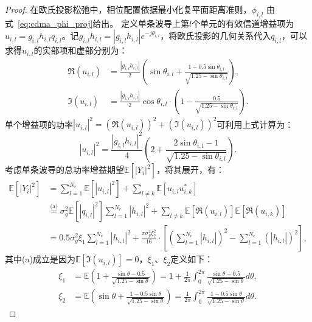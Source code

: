 \begin{proof}
	在欧氏投影松弛中，相位配置依据最小化复平面距离准则，$\phi_{i,l}$ 由式~\eqref{eq:cdma_phi_proj}给出。
	定义单条波导上第$l$个单元的有效信道增益项为$u_{i,l} = g_{i,l} h_{i,l} q_{i,l}$。记$g_{i,l} h_{i,l} = |g_{i,l} h_{i,l}| e^{-j\theta_{i,l}}$，将欧氏投影的几何关系代入$q_{i,l}$，可以求得$u_{i,l}$的实部项和虚部分别为：
	\begin{align}
		\Re(u_{i,l}) &= \frac{|g_{i,l} h_{i,l}|}{2} \left( \sin\theta_{i,l} + \frac{1 - 0.5\sin\theta_{i,l}}{\sqrt{1.25 - \sin\theta_{i,l}}} \right), \\
		\Im(u_{i,l}) &= \frac{|g_{i,l} h_{i,l}|}{2} \cos\theta_{i,l}\cdot \left( 1 - \frac{0.5}{\sqrt{1.25 - \sin\theta_{i,l}}} \right).
	\end{align}
	单个增益项的功率$|u_{i,l}|^2=(\Re(u_{i,l}))^2+(\Im(u_{i,l}))^2$可利用上式计算为：
	\begin{equation}
		|u_{i,l}|^2 
		= \frac{|g_{i,l}h_{i,l}|^2}{4} \left(2 + \frac{2\sin\theta_{i,l} - 1}{\sqrt{1.25 - \sin\theta_{i,l}}}\right).
	\end{equation}
	考虑单条波导的总功率增益期望$\mathbb{E}[|Y_i|^2]$，将其展开，有：
	\begin{align}
		\mathbb{E}[|Y_i|^2] 
		&= \sum_{l=1}^{N_e} \mathbb{E}[|u_{i,l}|^2] + \sum_{l \neq k} \mathbb{E}[u_{i,l} u_{i,k}^*] \\
		&\overset{\text{(a)}}{=} \sigma_g^2 \mathbb{E}[|q_{i,l}|^2] \sum_{l=1}^{N_e} |h_{i,l}|^2 
		+ \sum_{l \neq k} \mathbb{E}[\Re(u_{i,l})] \mathbb{E}[\Re(u_{i,k})]
		\\
		&= 0.5\sigma_g^2 \xi_1 \sum_{l=1}^{N_e} |h_{i,l}|^2 
		+ \frac{\pi \sigma_g^2 \xi_2^2}{16}
		\cdot \left[ \left( \sum_{l=1}^{N_e} |h_{i,l}| \right)^2 - \sum_{l=1}^{N_e} \left(|h_{i,l}| \right)^2 \right],
	\end{align}
	其中(a)成立是因为$\mathbb{E}[\Im(u_{i,l})]=0$，$\xi_1$、$\xi_2$定义如下：
	\begin{align}
		\xi_1&=\mathbb{E}\left(1 + \frac{\sin\theta - 0.5}{\sqrt{1.25 - \sin\theta}}\right)
		= 1+\frac{1}{2\pi}\int_{0}^{2\pi} \frac{\sin\theta - 0.5}{\sqrt{1.25 - \sin\theta}}  d\theta, \\
		\xi_2&=\mathbb{E}\left( \sin\theta + \frac{1 - 0.5\sin\theta}{\sqrt{1.25 - \sin\theta}} \right)
		=\frac{1}{2\pi} \int_{0}^{2\pi} \frac{1 - 0.5\sin\theta}{\sqrt{1.25 - \sin\theta}}  d\theta.
	\end{align}
	

\end{proof}
